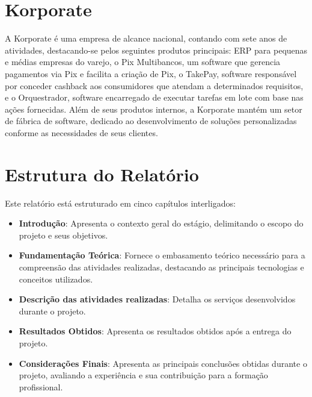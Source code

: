 \section{Korporate}

A Korporate é uma empresa de alcance nacional, contando com sete anos de atividades, 
destacando-se pelos seguintes produtos principais: ERP para pequenas e médias 
empresas do varejo, o Pix Multibancos, um software que gerencia pagamentos via Pix 
e facilita a criação de Pix, o TakePay, software responsável por conceder cashback 
aos consumidores que atendam a determinados requisitos, e o Orquestrador, software 
encarregado de executar tarefas em lote com base nas ações fornecidas. Além de seus 
produtos internos, a Korporate mantém um setor de fábrica de software, dedicado ao 
desenvolvimento de soluções personalizadas conforme as necessidades de seus 
clientes.

\section{Estrutura do Relatório}

Este relatório está estruturado em cinco capítulos interligados:

\begin{itemize}

\item \textbf{Introdução}: Apresenta o contexto geral do estágio, delimitando o 
escopo do projeto e seus objetivos.

\item \textbf{Fundamentação Teórica}:  Fornece o embasamento teórico necessário 
para a compreensão das atividades realizadas, destacando as principais tecnologias 
e conceitos utilizados.

\item \textbf{Descrição das atividades realizadas}: Detalha os serviços 
desenvolvidos durante o projeto.

\item \textbf{Resultados Obtidos}: Apresenta os resultados obtidos após a entrega do projeto.

\item \textbf{Considerações Finais}: Apresenta as principais conclusões obtidas 
durante o projeto, avaliando a experiência e sua contribuição para a formação 
profissional.

\end{itemize}